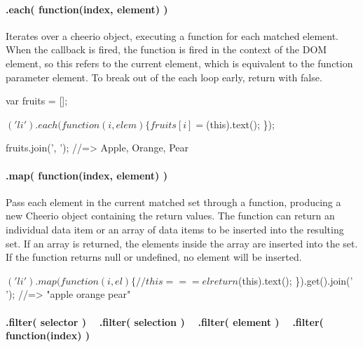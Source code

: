 

\paragraph*{.each( function(index, element) )}

Iterates over a cheerio object, executing a function for each matched element. When the callback is fired, the function is fired in the context of the D\+OM element, so {\ttfamily this} refers to the current element, which is equivalent to the function parameter {\ttfamily element}. To break out of the {\ttfamily each} loop early, return with {\ttfamily false}.


\begin{DoxyCode}
var fruits = [];

$('li').each(function(i, elem) \{
  fruits[i] = $(this).text();
\});

fruits.join(', ');
//=> Apple, Orange, Pear
\end{DoxyCode}


\paragraph*{.map( function(index, element) )}

Pass each element in the current matched set through a function, producing a new Cheerio object containing the return values. The function can return an individual data item or an array of data items to be inserted into the resulting set. If an array is returned, the elements inside the array are inserted into the set. If the function returns null or undefined, no element will be inserted.


\begin{DoxyCode}
$('li').map(function(i, el) \{
  // this === el
  return $(this).text();
\}).get().join(' ');
//=> "apple orange pear"
\end{DoxyCode}


\paragraph*{.filter( selector ) ~\newline
 .filter( selection ) ~\newline
 .filter( element ) ~\newline
 .filter( function(index) )}

